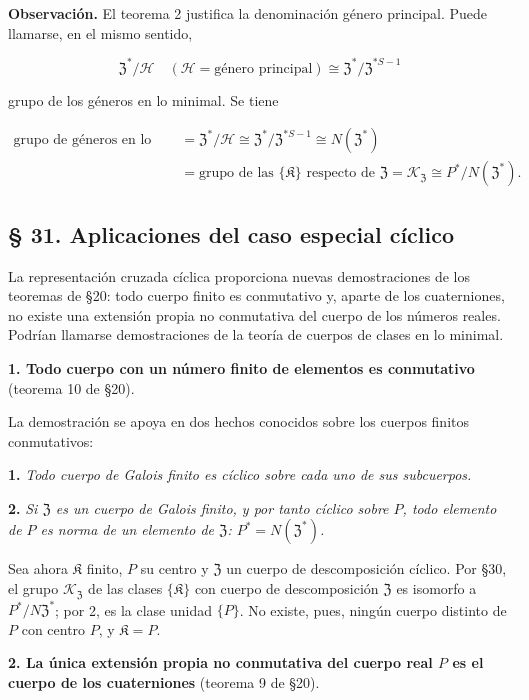 \noindent\textbf{Observación.} El teorema 2 justifica la denominación género principal. Puede llamarse, en el mismo sentido,

\[
\mathfrak Z^*/\mathscr H
\quad(\mathscr H=\text{género principal})
\cong\mathfrak Z^*/\mathfrak Z^{*S-1}
\]

grupo de los géneros en lo minimal. Se tiene

\[
\begin{aligned}
\text{grupo de géneros en lo minimal}
&=\mathfrak Z^*/\mathscr H
\cong\mathfrak Z^*/\mathfrak Z^{*S-1}
\cong N(\mathfrak Z^*)\\
&=\text{grupo de las }\{\mathfrak K\}\text{ respecto de }\mathfrak Z
=\mathscr K_{\mathfrak Z}
\cong P^*/N(\mathfrak Z^*).
\end{aligned}
\]

\subsection*{§ 31. Aplicaciones del caso especial cíclico}\label{anwendungen-des-zyklischen-spezialfalles}

La representación cruzada cíclica proporciona nuevas demostraciones de los teoremas de §20: todo cuerpo finito es conmutativo y, aparte de los cuaterniones, no existe una extensión propia no conmutativa del cuerpo de los números reales. Podrían llamarse demostraciones de la teoría de cuerpos de clases en lo minimal.

\noindent\textbf{1. Todo cuerpo con un número finito de elementos es conmutativo} (teorema 10 de §20).

La demostración se apoya en dos hechos conocidos sobre los cuerpos finitos conmutativos:

\noindent\textbf{1.} \emph{Todo cuerpo de Galois finito es cíclico sobre cada uno de sus subcuerpos.}

\noindent\textbf{2.} \emph{Si $\mathfrak Z$ es un cuerpo de Galois finito, y por tanto cíclico sobre $P$, todo elemento de $P$ es norma de un elemento de $\mathfrak Z$: $P^*=N(\mathfrak Z^*)$.}

Sea ahora $\mathfrak K$ finito, $P$ su centro y $\mathfrak Z$ un cuerpo de descomposición cíclico. Por §30, el grupo $\mathscr K_{\mathfrak Z}$ de las clases $\{\mathfrak K\}$ con cuerpo de descomposición $\mathfrak Z$ es isomorfo a $P^*/N\mathfrak Z^*$; por 2, es la clase unidad $\{P\}$. No existe, pues, ningún cuerpo distinto de $P$ con centro $P$, y $\mathfrak K=P$.

\noindent\textbf{2. La única extensión propia no conmutativa del cuerpo real $P$ es el cuerpo de los cuaterniones} (teorema 9 de §20).

